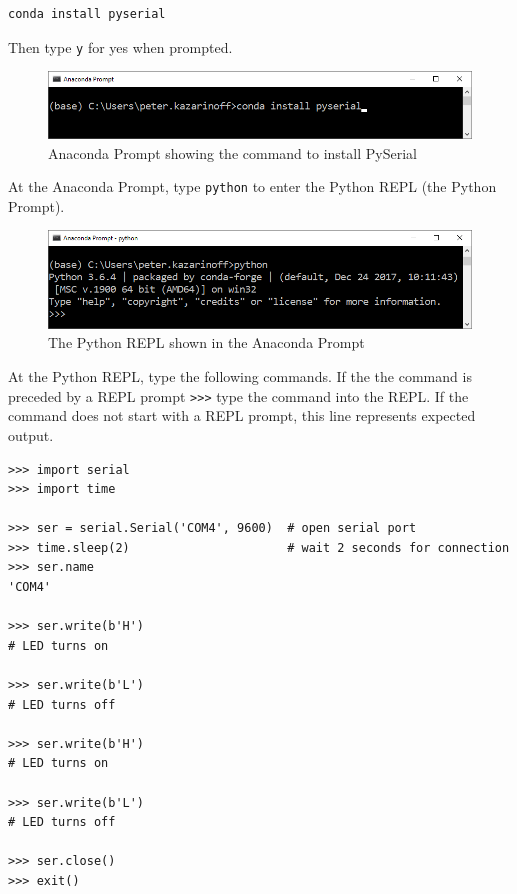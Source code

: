 \begin{verbatim}
conda install pyserial
\end{verbatim}

Then type \texttt{y} for yes when prompted.

\begin{figure}[h!]
\centering
\includegraphics{images/anaconda_prompt_install_pyserial.png}
\caption{Anaconda Prompt showing the command to install PySerial}
\end{figure}

At the Anaconda Prompt, type \texttt{python} to enter the Python REPL
(the Python Prompt).

\begin{figure}[h!]
\centering
\includegraphics{images/anaconda_prompt_python_REPL.png}
\caption{The Python REPL shown in the Anaconda Prompt}
\end{figure}

At the Python REPL, type the following commands. If the the command is
preceded by a REPL prompt
\texttt{\textgreater{}\textgreater{}\textgreater{}} type the command
into the REPL. If the command does not start with a REPL prompt, this
line represents expected output.

\begin{verbatim}
>>> import serial
>>> import time

>>> ser = serial.Serial('COM4', 9600)  # open serial port
>>> time.sleep(2)                      # wait 2 seconds for connection
>>> ser.name
'COM4'

>>> ser.write(b'H')
# LED turns on

>>> ser.write(b'L')
# LED turns off

>>> ser.write(b'H')
# LED turns on

>>> ser.write(b'L')
# LED turns off

>>> ser.close()
>>> exit()
\end{verbatim}

